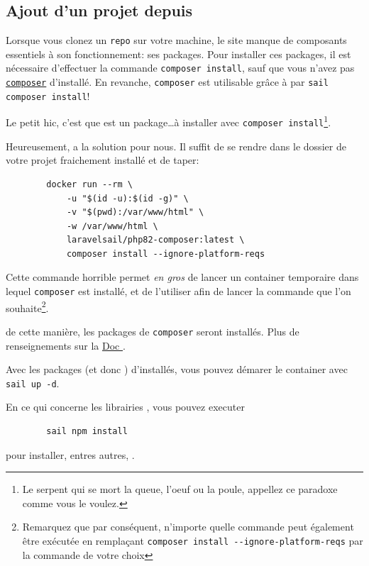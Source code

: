     \newpage
    \subsection[Ajout d'un projet depuis GitHub]{Ajout d'un projet depuis \github{}\label{sec:project_git}}

    Lorsque vous clonez un \texttt{repo} sur votre machine, le site manque de composants essentiels à son fonctionnement: ses packages. Pour installer ces packages, il est nécessaire d'effectuer la commande \verb|composer install|, sauf que vous n'avez pas \texttt{\href{https://getcomposer.org/doc/00-intro.md}{composer}} d'installé. En revanche, \texttt{composer} est utilisable grâce à  \laravelsail{} par \verb|sail composer install|!

    Le petit hic, c'est que \laravelsail{} est un package\ldots à installer avec \verb|composer install|\footnote{Le serpent qui se mort la queue, l'oeuf ou la poule, appellez ce paradoxe comme vous le voulez.}. 

    Heureusement, \laravel{} a la solution pour nous. Il suffit de se rendre dans le dossier de votre projet fraichement installé et de taper:
    \begin{lstlisting}
        docker run --rm \
            -u "$(id -u):$(id -g)" \
            -v "$(pwd):/var/www/html" \
            -w /var/www/html \
            laravelsail/php82-composer:latest \
            composer install --ignore-platform-reqs
    \end{lstlisting}

    Cette commande horrible permet \textit{en gros} de lancer un container temporaire dans lequel \texttt{composer} est installé, et de l'utiliser afin de lancer la commande que l'on souhaite\footnote{Remarquez que par conséquent, n'importe quelle commande \php{} peut également être exécutée en remplaçant \verb|composer install --ignore-platform-reqs| par la commande de votre choix}.

    de cette manière, les packages de \texttt{composer} seront installés. Plus de renseignements sur la \href{https://laravel.com/docs/10.x/sail#installing-composer-dependencies-for-existing-projects}{Doc \laravel}.
    
    Avec les packages (et donc \laravelsail{}) d'installés, vous pouvez démarer le container avec \verb|sail up -d|.

    En ce qui concerne les librairies \js{}, vous pouvez executer 
    \begin{lstlisting}
        sail npm install
    \end{lstlisting}
    pour installer, entres autres, \vite.

